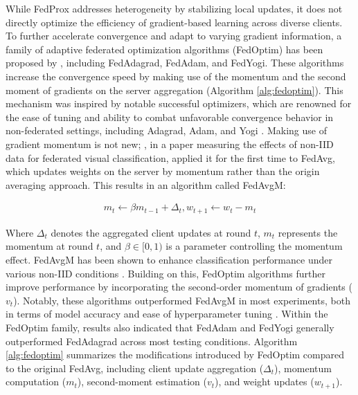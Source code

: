 While FedProx addresses heterogeneity by stabilizing local updates, it does not directly optimize the efficiency of gradient-based learning across diverse clients. To further accelerate convergence and adapt to varying gradient information, a family of adaptive federated optimization algorithms (FedOptim) has been proposed by \cite{fedoptim}, including FedAdagrad, FedAdam, and FedYogi. These algorithms increase the convergence speed by making use of the momentum and the second moment of gradients on the server aggregation (Algorithm \ref{alg:fedoptim}). This mechanism was inspired by notable successful optimizers, which are renowned for the ease of tuning and ability to combat unfavorable convergence behavior in non-federated settings, including Adagrad, Adam, and Yogi \citep{fedoptim}. Making use of gradient momentum is not new; \cite{fedavgm}, in a paper measuring the effects of non-IID data for federated visual classification, applied it for the first time to FedAvg, which updates weights on the server by momentum rather than the origin averaging approach. This results in an algorithm called FedAvgM:

\begin{align}
m_t \gets \beta m_{t-1} + \Delta_t, w_{t+1} \gets w_t - m_t
\end{align}

Where $\Delta_t$ denotes the aggregated client updates at round $t$, $m_t$ represents the momentum at round $t$, and $\beta \in [0, 1)$ is a parameter controlling the momentum effect. FedAvgM has been shown to enhance classification performance under various non-IID conditions \citep{fedavgm}. Building on this, FedOptim algorithms further improve performance by incorporating the second-order momentum of gradients ($v_t$). Notably, these algorithms outperformed FedAvgM in most experiments, both in terms of model accuracy and ease of hyperparameter tuning \citep{fedoptim}. Within the FedOptim family, results also indicated that FedAdam and FedYogi generally outperformed FedAdagrad across most testing conditions. Algorithm \ref{alg:fedoptim} summarizes the modifications introduced by FedOptim compared to the original FedAvg, including client update aggregation ($\Delta_t$), momentum computation ($m_t$), second-moment estimation ($v_t$), and weight updates ($w_{t+1}$).

